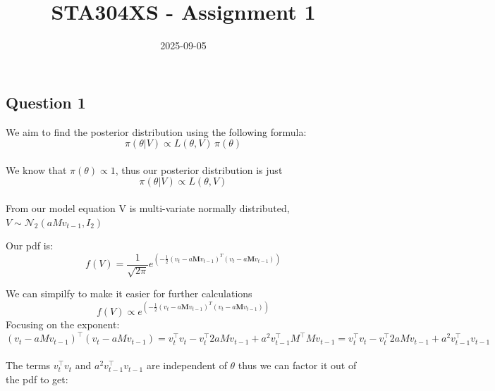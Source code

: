 \documentclass[12pt,halfline,a4paper,]{ouparticle}
\begin{document}
\title{STA304XS - Assignment 1}

\author{%
%
%
%
%
%
%
%
%
%
\and
{}
%
%
%
%
%
%
}


\date{2025-09-05}


\maketitle



\subsection{Question 1}\label{question-1}

We aim to find the posterior distribution using the following formula:\\
\[\pi(\theta|V) \propto L(\theta,V)\,\pi(\theta)\]\\
We know that \(\pi(\theta) \propto 1\), thus our posterior distribution
is just\\
\[\pi(\theta|V) \propto L(\theta,V)\]\\
From our model equation V is multi-variate normally distributed,
\(V \sim \mathcal{N}_2(a M v_{t-1}, I_2)\)

\hfill\break
Our pdf is:\\
\[f(V) = \frac{1}{\sqrt{2\pi}} e^{(-\frac{1}{2}(v_t-a\pmb Mv_{t-1})^T(v_t-a\pmb Mv_{t-1}))}\]

We can simpilfy to make it easier for further calculations\\
\[f(V) \propto e^{(-\frac{1}{2}(v_t-a\pmb Mv_{t-1})^T(v_t-a\pmb Mv_{t-1}))}\]
Focusing on the exponent:\\
\[(v_t-aMv_{t-1})^\top(v_t-aMv_{t-1}) = v_t^\top v_t -v_t^\top 2aMv_{t-1} +a^2v_{t-1}^\top M^\top Mv_{t-1} =v_t^\top v_t  -v_t^\top 2aMv_{t-1} +a^2v_{t-1}^\top v_{t-1}\]\\
The terms \(v_t^\top v_t\) and \(a^2v_{t-1}^\top v_{t-1}\) are
independent of \(\theta\) thus we can factor it out of the pdf to get:
\end{document}
